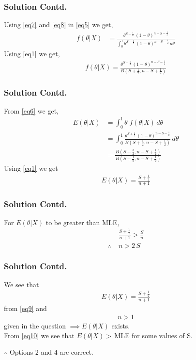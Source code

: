 \documentclass{beamer}
\providecommand{\brak}[1]{\ensuremath{\left(#1\right)}}
\begin{document}
\begin{frame}
  \frametitle{Solution Contd.} 
      Using \eqref{eq7} and \eqref{eq8} in \eqref{eq5} we get,
      \begin{align}
        f\brak{\theta|X} &= \frac{\theta^{S-\frac{1}{2}}\,\brak{1-\theta}^{n-S-\frac{1}{2}}}{\int_0^1 \theta^{S-\frac{1}{2}}\,\brak{1-\theta}^{n-S-\frac{1}{2}}\,d\theta}
    \end{align}
    Using \eqref{eq1} we get,
    \begin{align}
        f\brak{\theta|X} = \frac{\theta^{S-\frac{1}{2}}\,\brak{1-\theta}^{n-S-\frac{1}{2}}}{B\brak{S+\frac{1}{2},n-S+\frac{1}{2}}}
    \end{align}
\end{frame}

    \begin{frame}
      \frametitle{Solution Contd.}
      From \eqref{eq6} we get,
\begin{align}
    E\brak{\theta|X} &= \int_0^1 \theta\;f\brak{\theta|X}\,d\theta\nonumber\\
    &=\int_0^1 \frac{\theta^{S+\frac{1}{2}}\,\brak{1-\theta}^{n-S-\frac{1}{2}}}{B\brak{S+\frac{1}{2},n-S+\frac{1}{2}}}\,d\theta\nonumber\\
    &=\frac{B\brak{S+\frac{3}{2},n-S+\frac{1}{2}}}{B\brak{S+\frac{1}{2},n-S+\frac{1}{2}}}
\end{align}
Using \eqref{eq1} we get
\begin{align}
    E\brak{\theta|X} = \frac{S+\frac{1}{2}}{n+1}\label{eq9}
\end{align}
\end{frame}

\begin{frame}
  \frametitle{Solution Contd.} 
   For $E\brak{\theta|X}$ to be greater than MLE,
\begin{align}
    &\frac{S+\frac{1}{2}}{n+1} > \frac{S}{n}\nonumber\\
     \therefore\;&n>2\,S\label{eq10}
\end{align}
\end{frame}

 \begin{frame}
  \frametitle{Solution Contd.} 
    We see that
    \begin{align*}
        E\brak{\theta|X} = \frac{S+\frac{1}{2}}{n+1} 
    \end{align*}
       from \eqref{eq9} and
    \begin{align*}
        n>1 
    \end{align*}
    given in the question $\implies E\brak{\theta|X}$ exists.\\
    
    From \eqref{eq10} we see that $E\brak{\theta|X}>\, $MLE for some values of S.

$\therefore$ Options 2 and 4 are correct.
\end{frame}
\end{document}
